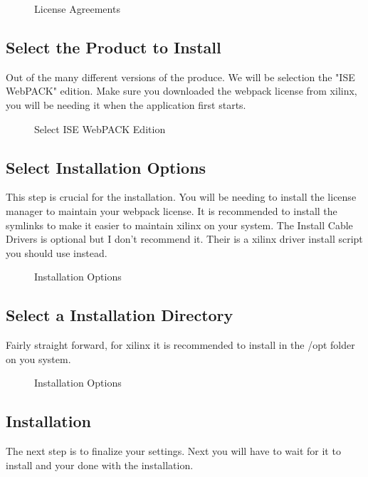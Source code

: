 \documentclass[letter]{article}
\begin{document}
\begin{figure}[!htbp]
  \centering
  \caption{License Agreements}
\end{figure}

\subsection{Select the Product to Install}
Out of the many different versions of the produce. We will be selection the "ISE WebPACK" edition. Make sure you downloaded the webpack license from xilinx, you will be needing it when the application first starts.

\begin{figure}[!htbp]
  \centering
  \caption{Select ISE WebPACK Edition}
\end{figure}

\subsection{Select Installation Options}
This step is crucial for the installation. You will be needing to install the license manager to maintain your webpack license. It is recommended to install the symlinks to make it easier to maintain xilinx on your system. The Install Cable Drivers is optional but I don't recommend it. Their is a xilinx driver install script you should use instead.

\begin{figure}[!htbp]
  \centering
  \caption{Installation Options}
\end{figure}

\subsection{Select a Installation Directory}
Fairly straight forward, for xilinx it is recommended to install in the /opt folder on you system.

\begin{figure}[!htbp]
  \centering
  \caption{Installation Options}
\end{figure}

\subsection{Installation}
The next step is to finalize your settings. Next you will have to wait for it to install and your done with the installation.
\end{document}
